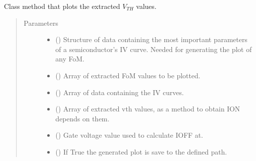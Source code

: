 \documentclass[letterpaper,10pt,english,openany, oneside]{sphinxmanual}
\begin{document}
\begin{fulllineitems}

\begin{fulllineitems}
\label{\detokenize{index:fompy.fom.ion_ext.plot}}
Class method that plots the extracted \(V_{TH}\) values.
\begin{quote}\begin{description}
\item[{Parameters}] \leavevmode\begin{itemize}
\item {} 
 () \textendash{} Structure of data containing the most important parameters of a semiconductor’s IV curve.
Needed for generating the plot of any FoM.

\item {} 
 () \textendash{} Array of extracted FoM values to be plotted.

\item {} 
 () \textendash{} Array of data containing the IV curves.

\item {} 
 () \textendash{} Array of extracted vth values, as a method to obtain ION depends on them.

\item {} 
 () \textendash{} Gate voltage value used to calculate IOFF at.

\item {} 
 () \textendash{} If True the generated plot is save to the defined path.

\end{itemize}

\end{description}\end{quote}


\end{fulllineitems}
\end{fulllineitems}
\end{document}

